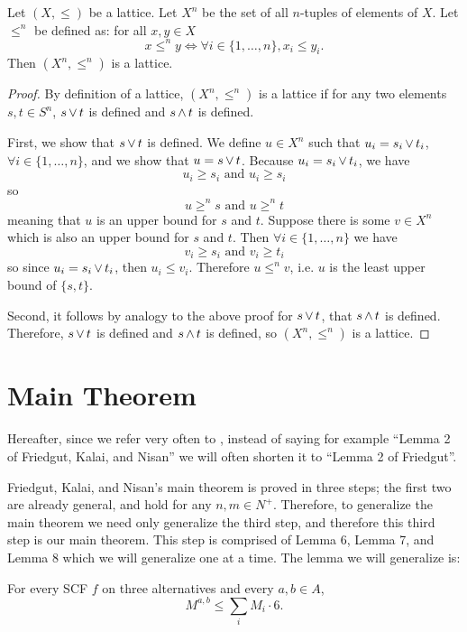 	\begin{proposition}
		\label{proposition-grid-is-lattice}
		Let $(X, \le)$ be a lattice. Let $X^n$ be the set of all $n$-tuples of elements of $X$. Let $\le^n$ be defined as: for all $x, y \in X$
		\[
			x \le^n y \iff \forall i \in \{1, \ldots, n\}, x_i \le y_i.
		\]
		Then $(X^n, \le^n)$ is a lattice.
	\end{proposition}

	\begin{proof}
		By definition of a lattice, $(X^n, \le^n)$ is a lattice if for any two elements $s, t \in S^n$, $s \operatorname{\vee} t$ is defined and $s \operatorname{\wedge} t$ is defined.

		First, we show that $s \operatorname{\vee} t$ is defined. We define $u \in X^n$ such that $u_i = s_i \operatorname{\vee} t_i$, $\forall i \in \{1, \ldots, n\}$, and we show that $u = s \operatorname{\vee} t$. Because $u_i = s_i \operatorname{\vee} t_i$, we have
		\[
			u_i \ge s_i \textrm{ and } u_i \ge s_i
		\]
		so
		\[
			u \ge^n s \textrm{ and } u \ge^n t
		\]
		meaning that $u$ is an upper bound for $s$ and $t$. Suppose there is some $v \in X^n$ which is also an upper bound for $s$ and $t$. Then $\forall i \in \{1, \ldots, n\}$ we have
		\[
			v_i \ge s_i \textrm{ and } v_i \ge t_i
		\]
		so since $u_i = s_i \operatorname{\vee} t_i$, then $u_i \le v_i$. Therefore $u \le^n v$, i.e. $u$ is the least upper bound of $\{s, t\}$.

		Second, it follows by analogy to the above proof for $s \operatorname{\vee} t$, that $s \operatorname{\wedge} t$ is defined. Therefore, $s \operatorname{\vee} t$ is defined and $s \operatorname{\wedge} t$ is defined, so $(X^n, \le^n)$ is a lattice.
	\end{proof}


\section{Main Theorem}

	Hereafter, since we refer very often to \cite{friedgut2008elections}, instead of saying for example ``Lemma 2 of Friedgut, Kalai, and Nisan'' we will often shorten it to ``Lemma 2 of Friedgut''.

	Friedgut, Kalai, and Nisan's main theorem is proved in three steps; the first two are already general, and hold for any $n, m \in N^+$. Therefore, to generalize the main theorem we need only generalize the third step, and therefore this third step is our main theorem. This step is comprised of Lemma 6, Lemma 7, and Lemma 8 which we will generalize one at a time. The lemma we will generalize is:

	\begin{lemma}
		For every SCF $f$ on three alternatives and every $a,b \in A$,
		\[
			M^{a,b} \le \sum_i M_i \cdot 6.
		\]
	\end{lemma}

